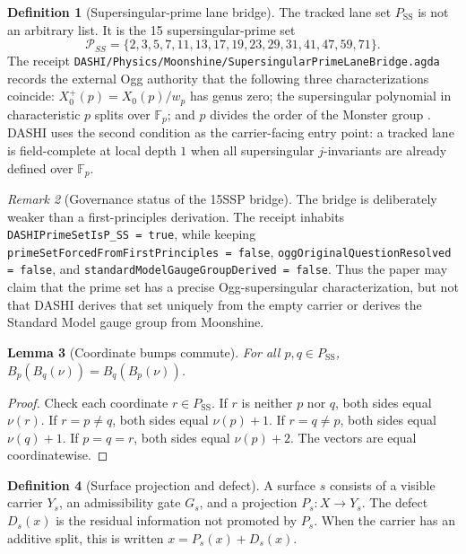 \documentclass[11pt]{article}
\theoremstyle{definition}
\newtheorem{definition}{Definition}[section]
\theoremstyle{plain}
\newtheorem{lemma}[definition]{Lemma}
\theoremstyle{remark}
\newtheorem{remark}[definition]{Remark}
\begin{document}
\begin{definition}[Supersingular-prime lane bridge]
The tracked lane set \(P_{\mathrm{SS}}\) is not an arbitrary list. It is the 15
supersingular-prime set
\[
\mathcal{P}_{SS}
=\{2,3,5,7,11,13,17,19,23,29,31,41,47,59,71\}.
\]
The receipt
\texttt{DASHI/Physics/Moonshine/SupersingularPrimeLaneBridge.agda} records the
external Ogg authority that the following three characterizations coincide:
\(X_0^+(p)=X_0(p)/w_p\) has genus zero; the supersingular polynomial in
characteristic \(p\) splits over \(\mathbb{F}_p\); and \(p\) divides the order
of the Monster group \cite{ogg-1975,borcherds-1992}. DASHI uses the second
condition as the carrier-facing entry point: a tracked lane is field-complete
at local depth \(1\) when all supersingular \(j\)-invariants are already
defined over \(\mathbb{F}_p\).
\end{definition}

\begin{remark}[Governance status of the 15SSP bridge]
The bridge is deliberately weaker than a first-principles derivation. The
receipt inhabits \texttt{DASHIPrimeSetIsP\_SS = true}, while keeping
\texttt{primeSetForcedFromFirstPrinciples = false},
\texttt{oggOriginalQuestionResolved = false}, and
\texttt{standardModelGaugeGroupDerived = false}. Thus the paper may claim that
the prime set has a precise Ogg-supersingular characterization, but not that
DASHI derives that set uniquely from the empty carrier or derives the Standard
Model gauge group from Moonshine.
\end{remark}

\begin{lemma}[Coordinate bumps commute]
For all \(p,q\in P_{\mathrm{SS}}\), \(B_p(B_q(\nu))=B_q(B_p(\nu))\).
\end{lemma}
\begin{proof}
Check each coordinate \(r\in P_{\mathrm{SS}}\). If \(r\) is neither \(p\) nor \(q\), both
sides equal \(\nu(r)\). If \(r=p\neq q\), both sides equal \(\nu(p)+1\). If
\(r=q\neq p\), both sides equal \(\nu(q)+1\). If \(p=q=r\), both sides equal
\(\nu(p)+2\). The vectors are equal coordinatewise.
\end{proof}

\begin{definition}[Surface projection and defect]
A surface \(s\) consists of a visible carrier \(Y_s\), an admissibility gate
\(G_s\), and a projection \(P_s:X\to Y_s\). The defect \(D_s(x)\) is the
residual information not promoted by \(P_s\). When the carrier has an additive
split, this is written \(x=P_s(x)+D_s(x)\).
\end{definition}
\end{document}
